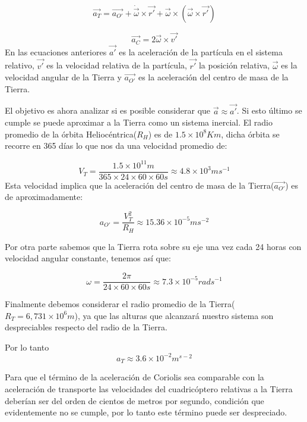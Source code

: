 \documentclass[main]{subfiles}
\begin{document}
\begin{equation}
\vec{a_T}=\vec{a_{O\prime}}+\dot{\vec{\omega}}\times\vec{r\prime}+\vec{\omega}\times (\vec{\omega}\times\vec{r\prime})
\end{equation}

\begin{equation}
\vec{a_C}=2\vec{\omega}\times\vec{v\prime}
\end{equation}
En las ecuaciones anteriores $\vec{a\prime}$ es la aceleraci\'on de la part\'icula en el sistema relativo, $\vec{v\prime}$ es la velocidad relativa de la part\'icula, $\vec{r\prime}$ la posici\'on relativa, $\vec{\omega}$ es la velocidad angular de la Tierra y $\vec{a_{O\prime}}$ es la aceleraci\'on del centro de masa de la Tierra.

El objetivo es ahora analizar si es posible considerar que $\vec{a}\approx\vec{a\prime}$. Si esto \'ultimo se cumple se puede aproximar a la Tierra como un sistema inercial. El radio promedio de la \'orbita Helioc\'entrica($R_H$) es de $1.5\times10^8Km$, dicha \'orbita se recorre en 365 d\'ias lo que nos da una velocidad promedio de:

\begin{equation}
V_T=\frac{1.5\times10^{11}m}{365\times24\times60\times60s}\approx4.8\times10^3ms^{-1}
\end{equation}
Esta velocidad implica que la aceleraci\'on del centro de masa de la Tierra($\vec{a_{O\prime}}$) es de aproximadamente:

\begin{equation}
a_{O\prime}=\frac{V_T^2}{R_H}\approx15.36\times10^{-5}ms^{-2}
\end{equation}

Por otra parte sabemos que la Tierra rota sobre su eje una vez cada 24 horas con velocidad angular constante, tenemos as\'i que:

\begin{equation}
\omega=\frac{2\pi}{24\times60\times60s}\approx7.3\times10^{-5}rad s^{-1}
\end{equation}

Finalmente debemos considerar el radio promedio de la Tierra($R_T=6,731\times10^{6}m$), ya que las alturas que alcanzar\'a nuestro sistema son despreciables respecto del radio de la Tierra. 

Por lo tanto 
\begin{equation}
a_T \approx 3.6\times10^{-2}m^{s-2}
\end{equation}

Para que el t\'ermino de la aceleraci\'on de Coriolis sea comparable con la aceleraci\'on de transporte las velocidades del cuadric\'optero relativas a la Tierra deber\'ian ser del orden de cientos de metros por segundo, condici\'on que evidentemente no se cumple, por lo tanto este t\'ermino puede ser despreciado. 
\end{document}
